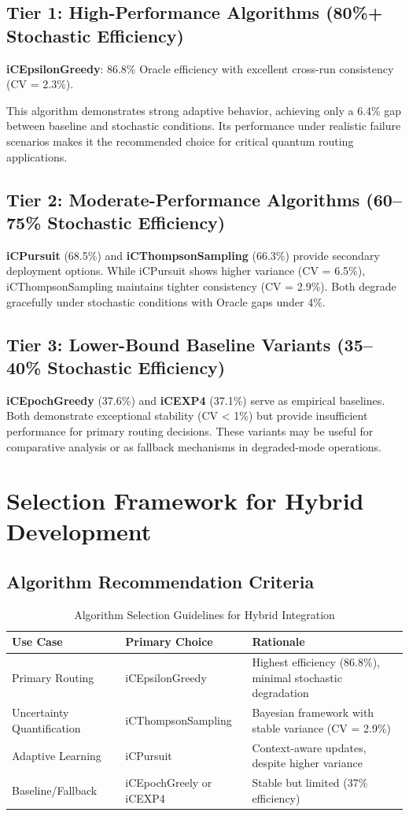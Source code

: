\documentclass[12pt,a4paper]{article}
\begin{document}
\subsection{Tier 1: High-Performance Algorithms (80\%+ Stochastic Efficiency)}
\textbf{iCEpsilonGreedy}: 86.8\% Oracle efficiency with excellent cross-run consistency (CV = 2.3\%).

This algorithm demonstrates strong adaptive behavior, achieving only a 6.4\% gap between baseline and stochastic conditions. Its performance under realistic failure scenarios makes it the recommended choice for critical quantum routing applications.

\subsection{Tier 2: Moderate-Performance Algorithms (60--75\% Stochastic Efficiency)}
\textbf{iCPursuit} (68.5\%) and \textbf{iCThompsonSampling} (66.3\%) provide secondary deployment options. While iCPursuit shows higher variance (CV = 6.5\%), iCThompsonSampling maintains tighter consistency (CV = 2.9\%). Both degrade gracefully under stochastic conditions with Oracle gaps under 4\%.

\subsection{Tier 3: Lower-Bound Baseline Variants (35--40\% Stochastic Efficiency)}
\textbf{iCEpochGreedy} (37.6\%) and \textbf{iCEXP4} (37.1\%) serve as empirical baselines. Both demonstrate exceptional stability (CV < 1\%) but provide insufficient performance for primary routing decisions. These variants may be useful for comparative analysis or as fallback mechanisms in degraded-mode operations.

\section{Selection Framework for Hybrid Development}

\subsection{Algorithm Recommendation Criteria}
\begin{table}[H]
\centering
\caption{Algorithm Selection Guidelines for Hybrid Integration}
\begin{tabular}{@{}lll@{}}
\toprule
\textbf{Use Case} & \textbf{Primary Choice} & \textbf{Rationale} \\
\midrule
Primary Routing & iCEpsilonGreedy & Highest efficiency (86.8\%), minimal stochastic degradation \\
Uncertainty Quantification & iCThompsonSampling & Bayesian framework with stable variance (CV = 2.9\%) \\
Adaptive Learning & iCPursuit & Context-aware updates, despite higher variance \\
Baseline/Fallback & iCEpochGreely or iCEXP4 & Stable but limited (37\% efficiency) \\
\bottomrule
\end{tabular}
\end{table}
\end{document}

